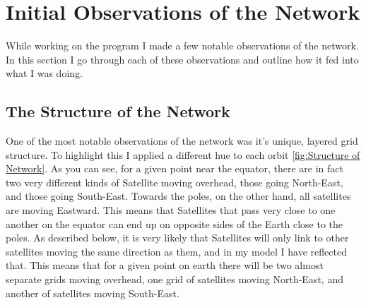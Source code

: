 \documentclass[12pt]{report}
\begin{document}
\section{Initial Observations of the Network}

While working on the program I made a few notable observations of the network. In this section I go through each of these observations and outline how it fed into what I was doing.

\subsection{The Structure of the Network}

One of the most notable observations of the network was it's unique, layered grid structure. To highlight this I applied a different hue to each orbit \ref{fig:Structure of Network}. As you can see, for a given point near the equator, there are in fact two very different kinds of Satellite moving overhead, those going North-East, and those going South-East. Towards the poles, on the other hand, all satellites are moving Eastward. This means that Satellites that pass very close to one another on the equator can end up on opposite sides of the Earth close to the poles. As described below, it is very likely that Satellites will only link to other satellites moving the same direction as them, and in my model I have reflected that. This means that for a given point on earth there will be two almost separate grids moving overhead, one grid of satellites moving North-East, and another of satellites moving South-East.
\end{document}
